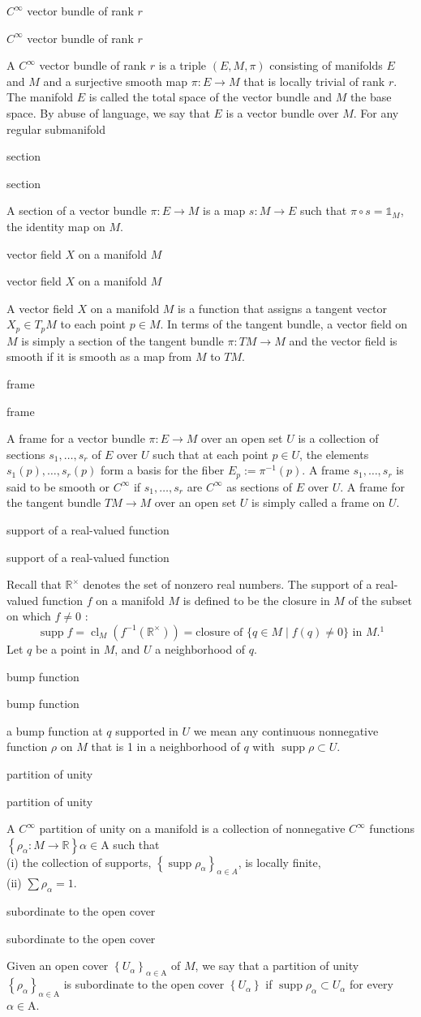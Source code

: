 \documentclass[17pt]{extarticle}
\newcommand{\boxset}[2]{\begin{mdframed}[style=darkQuesion]
#1
\end{mdframed}
\newpage
\begin{mdframed}[style=darkQuesion]
  #1
    \end{mdframed}
\begin{mdframed}[style=darkAnswer]
  #2
    \end{mdframed}
    \newpage
}
\begin{document}
\boxset{$C^{\infty}$ vector bundle of rank $r$}
{A $C^{\infty}$ vector bundle of rank $r$ is a triple $(E, M, \pi)$ consisting of manifolds $E$ and $M$ and a surjective smooth map $\pi: E \rightarrow M$ that is locally trivial of rank $r$. The manifold $E$ is called the total space of the vector bundle and $M$ the base space. By abuse of language, we say that $E$ is a vector bundle over $M$. For any regular submanifold}
\boxset{section}
{A section of a vector bundle $\pi: E \rightarrow M$ is a map $s: M \rightarrow E$ such that $\pi \circ s=\mathbb{1}_{M}$, the identity map on $M$.}
\boxset{vector field $X$ on a manifold $M$}
{A vector field $X$ on a manifold $M$ is a function that assigns a tangent vector $X_{p} \in T_{p} M$ to each point $p \in M$. In terms of the tangent bundle, a vector field on $M$ is simply a section of the tangent bundle $\pi: T M \rightarrow M$ and the vector field is smooth if it is smooth as a map from $M$ to $T M$.}
\boxset{frame}
{A frame for a vector bundle $\pi: E \rightarrow M$ over an open set $U$ is a collection of sections $s_{1}, \ldots, s_{r}$ of $E$ over $U$ such that at each point $p \in U$, the elements $s_{1}(p), \ldots, s_{r}(p)$ form a basis for the fiber $E_{p}:=\pi^{-1}(p)$. A frame $s_{1}, \ldots, s_{r}$ is said to be smooth or $C^{\infty}$
if $s_{1}, \ldots, s_{r}$ are $C^{\infty}$ as sections of $E$ over $U$. A frame for the tangent bundle $T M \rightarrow M$ over an open set $U$ is simply called a frame on $U$.}
\boxset{support of a real-valued function}
{Recall that $\mathbb{R}^{\times}$ denotes the set of nonzero real numbers. The support of a real-valued function $f$ on a manifold $M$ is defined to be the closure in $M$ of the subset on which $f \neq 0$ :
\[\operatorname{supp} f=\operatorname{cl}_{M}\left(f^{-1}\left(\mathbb{R}^{\times}\right)\right)=\text {closure of }\{q \in M \mid f(q) \neq 0\} \text { in } M .{ }^{1}\]
Let $q$ be a point in $M$, and $U$ a neighborhood of $q$. }
\boxset{bump function }
{a bump function at $q$ supported in $U$ we mean any continuous nonnegative function $\rho$ on $M$ that is 1 in a neighborhood of $q$ with $\operatorname{supp} \rho \subset U$.}
\boxset{partition of unity}
{A $C^{\infty}$ partition of unity on a manifold is a collection of nonnegative $C^{\infty}$ functions $\left\{\rho_{\alpha}: M \rightarrow \mathbb{R}\right\} \alpha \in \mathrm{A}$ such that\[\ \]
(i) the collection of supports, $\left\{\operatorname{supp} \rho_{\alpha}\right\}_{\alpha \in A}$, is locally finite,\[\ \]
(ii) $\sum \rho_{\alpha}=1$.}
\boxset{subordinate to the open cover}
{Given an open cover $\left\{U_{\alpha}\right\}_{\alpha \in \mathrm{A}}$ of $M$, we say that a partition of unity $\left\{\rho_{\alpha}\right\}_{\alpha \in \mathrm{A}}$ is subordinate to the open cover $\left\{U_{\alpha}\right\}$ if $\operatorname{supp} \rho_{\alpha} \subset U_{\alpha}$ for every $\alpha \in \mathrm{A}$.}
\end{document}
